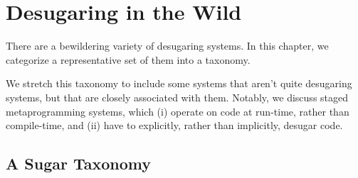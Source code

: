 \chapter{Desugaring in the Wild}\label{chap:taxonomy}

There are a bewildering variety of desugaring systems.  In this
chapter, we categorize a representative set of them into a taxonomy.

We stretch this taxonomy to include some systems that aren't quite
desugaring systems, but that are closely associated with
them. Notably, we discuss staged metaprogramming systems, which (i)
operate on code at run-time, rather than compile-time, and (ii) have
to explicitly, rather than implicitly, desugar code.

\section{A Sugar Taxonomy}

